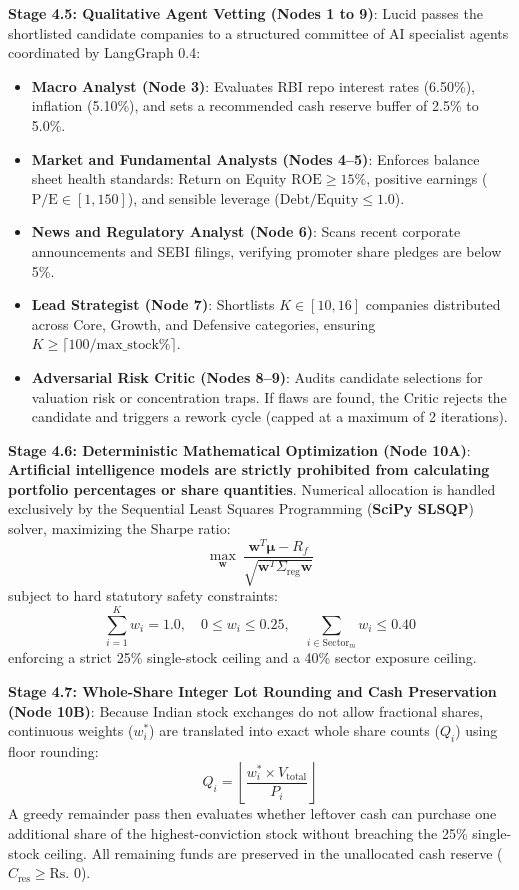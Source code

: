 \noindent \textbf{Stage 4.5: Qualitative Agent Vetting (Nodes 1 to 9)}:
Lucid passes the shortlisted candidate companies to a structured committee of AI specialist agents coordinated by LangGraph 0.4:
\begin{itemize}
    \item \textbf{Macro Analyst (Node 3)}: Evaluates RBI repo interest rates (6.50\%), inflation (5.10\%), and sets a recommended cash reserve buffer of 2.5\% to 5.0\%.
    \item \textbf{Market and Fundamental Analysts (Nodes 4--5)}: Enforces balance sheet health standards: Return on Equity $\text{ROE} \ge 15\%$, positive earnings ($\text{P/E} \in [1, 150]$), and sensible leverage ($\text{Debt/Equity} \le 1.0$).
    \item \textbf{News and Regulatory Analyst (Node 6)}: Scans recent corporate announcements and SEBI filings, verifying promoter share pledges are below 5\%.
    \item \textbf{Lead Strategist (Node 7)}: Shortlists $K \in [10, 16]$ companies distributed across Core, Growth, and Defensive categories, ensuring $K \ge \lceil 100 / \text{max\_stock\%} \rceil$.
    \item \textbf{Adversarial Risk Critic (Nodes 8--9)}: Audits candidate selections for valuation risk or concentration traps. If flaws are found, the Critic rejects the candidate and triggers a rework cycle (capped at a maximum of 2 iterations).
\end{itemize}

\noindent \textbf{Stage 4.6: Deterministic Mathematical Optimization (Node 10A)}:
\textbf{Artificial intelligence models are strictly prohibited from calculating portfolio percentages or share quantities}. Numerical allocation is handled exclusively by the Sequential Least Squares Programming (\textbf{SciPy SLSQP}) solver, maximizing the Sharpe ratio:
\begin{equation}
\max_{\mathbf{w}} \ \frac{\mathbf{w}^T \boldsymbol{\mu} - R_f}{\sqrt{\mathbf{w}^T \Sigma_{\text{reg}} \mathbf{w}}}
\end{equation}
subject to hard statutory safety constraints:
\begin{equation}
\sum_{i=1}^{K} w_i = 1.0, \quad 0 \le w_i \le 0.25, \quad \sum_{i \in \text{Sector}_m} w_i \le 0.40
\end{equation}
enforcing a strict 25\% single-stock ceiling and a 40\% sector exposure ceiling.

\noindent \textbf{Stage 4.7: Whole-Share Integer Lot Rounding and Cash Preservation (Node 10B)}:
Because Indian stock exchanges do not allow fractional shares, continuous weights ($w_i^*$) are translated into exact whole share counts ($Q_i$) using floor rounding:
\begin{equation}
Q_i = \left\lfloor \frac{w_i^* \times V_{\text{total}}}{P_i} \right\rfloor
\end{equation}
A greedy remainder pass then evaluates whether leftover cash can purchase one additional share of the highest-conviction stock without breaching the 25\% single-stock ceiling. All remaining funds are preserved in the unallocated cash reserve ($C_{\text{res}} \ge \text{Rs.~}0$).

